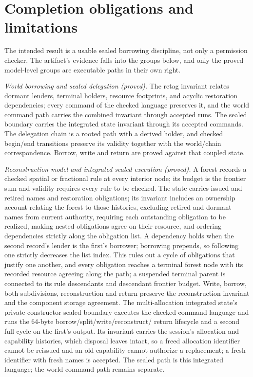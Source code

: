 \documentclass[a4paper,UKenglish,cleveref]{lipics-v2021}
\begin{document}
\section{Completion obligations and limitations}
\label{sec:limits}

The intended result is a usable sealed borrowing discipline, not only a
permission checker. The artifact's evidence falls into the groups below, and only
the proved model-level groups are executable paths in their own right.

\emph{World borrowing and sealed delegation (proved).} The retag invariant
relates dormant lenders, terminal holders, resource footprints, and acyclic
restoration dependencies; every command of the checked language preserves it,
and the world command path carries the combined invariant through accepted
runs. The sealed boundary carries the integrated state invariant through its
accepted commands. The delegation chain is a rooted path with a derived holder,
and checked begin/end transitions preserve its validity together with the
world/chain correspondence. Borrow, write and return are proved against that
coupled state.

\emph{Reconstruction model and integrated sealed execution (proved).} A forest
records a checked spatial or fractional rule at every
interior node; its budget is the frontier sum and validity requires every rule to
be checked. The state carries issued and retired names and restoration
obligations; its invariant includes an ownership account relating the forest to
those histories, excluding retired and dormant names from current authority,
requiring each outstanding obligation to be realized, making nested obligations
agree on their resource, and ordering dependencies strictly along the obligation
list. A dependency holds when the second record's lender is the first's
borrower; borrowing prepends, so following one strictly decreases the list
index. This rules out a cycle of obligations that justify one another, and every
obligation reaches a terminal forest node with its recorded resource agreeing
along the path; a suspended terminal parent is connected to its rule
descendants and descendant frontier budget. Write, borrow, both subdivisions,
reconstruction and return preserve the reconstruction invariant and the component
storage agreement. The
multi-allocation integrated state's private-constructor sealed boundary executes
the checked command language and runs the 64-byte borrow/split/write/reconstruct/
return lifecycle and a second full cycle on the first's output. Its invariant
carries the session's allocation and capability histories, which disposal leaves
intact, so a freed allocation identifier cannot be reissued and an old capability
cannot authorize a replacement; a fresh identifier with fresh names is accepted. The
sealed path
is this integrated language; the world command path remains separate.
\end{document}
